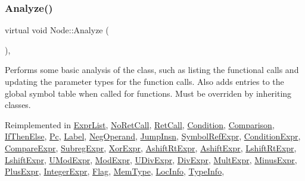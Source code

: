 \subsubsection{\texorpdfstring{Analyze()}{Analyze()}}
{\footnotesize\ttfamily virtual void Node\+::\+Analyze (\begin{DoxyParamCaption}{ }\end{DoxyParamCaption})\hspace{0.3cm}{\ttfamily [inline]}, {\ttfamily [virtual]}}

Performs some basic analysis of the class, such as listing the functional calls and updating the parameter types for the function calls. Also adds entries to the global symbol table when called for functions. Must be overriden by inheriting classes. 

Reimplemented in \hyperlink{class_expr_list_ade8c035ff7457f304c32066712d55e2e}{Expr\+List}, \hyperlink{class_no_ret_call_a9714a8c4429eb932be749909b47394fa}{No\+Ret\+Call}, \hyperlink{class_ret_call_ae97ba198b2aff2badbee17b2f02d989a}{Ret\+Call}, \hyperlink{class_condition_a899d0ab9bddcbe9f23bf0c8af84d7d10}{Condition}, \hyperlink{class_comparison_a4f77494c5f58ec539b190352455a71fb}{Comparison}, \hyperlink{class_if_then_else_a4c6beae98e9fe6d40836fdca839d76a7}{If\+Then\+Else}, \hyperlink{class_pc_a8376e5338c6f9c37363f1012722efef9}{Pc}, \hyperlink{class_label_ae77a5d8983fc941f8289a8ba4e4b56c1}{Label}, \hyperlink{class_neg_operand_a4b7facfe7b6947f5ae0118866b5c013e}{Neg\+Operand}, \hyperlink{class_jump_insn_a2173add8387a3b8bb0e5813942e42b38}{Jump\+Insn}, \hyperlink{class_symbol_ref_expr_aa410e63dd4602d66bda4e880afdb82e9}{Symbol\+Ref\+Expr}, \hyperlink{class_condition_expr_a6bad5562b63bd649a1ed921e43de0dca}{Condition\+Expr}, \hyperlink{class_compare_expr_a6433597757238a3332c637c1ad67ea87}{Compare\+Expr}, \hyperlink{class_subreg_expr_acc9be43aae902cf0727ba6b7ab8d85b1}{Subreg\+Expr}, \hyperlink{class_xor_expr_a94f8a8dfc88b60756ed6487299a1d74d}{Xor\+Expr}, \hyperlink{class_ashift_rt_expr_a324ffb5777b5ccea0e63eba79e0c67c8}{Ashift\+Rt\+Expr}, \hyperlink{class_ashift_expr_a526909d8abcf6a4286835103a0029373}{Ashift\+Expr}, \hyperlink{class_lshift_rt_expr_ae9b2290c259d8d21997f1498d79b4f40}{Lshift\+Rt\+Expr}, \hyperlink{class_lshift_expr_a7d479d7c72009f168afdb15b08e73163}{Lshift\+Expr}, \hyperlink{class_u_mod_expr_a0c1da57d7e2aff1e0e6f46f14f784a83}{U\+Mod\+Expr}, \hyperlink{class_mod_expr_aedcba31811fa2e4311c77a1989ca1d5c}{Mod\+Expr}, \hyperlink{class_u_div_expr_a5c7df8e6be9e8f173b9920d5c13e704f}{U\+Div\+Expr}, \hyperlink{class_div_expr_ac2e3fa38bfbe56b3f832266e1679200f}{Div\+Expr}, \hyperlink{class_mult_expr_accc5d3ee9e4a837eb82c8a51440f69ac}{Mult\+Expr}, \hyperlink{class_minus_expr_af9eea4a87688777fd1ad108c24dbcd11}{Minus\+Expr}, \hyperlink{class_plus_expr_aaf2180ee0d3019f23212104587c0cbb9}{Plus\+Expr}, \hyperlink{class_integer_expr_a523ca156f0653534b5c142fd496de7a4}{Integer\+Expr}, \hyperlink{class_flag_ae09e99101902e5486e9d5712749623b3}{Flag}, \hyperlink{class_mem_type_a40773866273e8e3321c67d1bfaab14da}{Mem\+Type}, \hyperlink{class_loc_info_a129d70c92d57a7ab130b699ee8052ef4}{Loc\+Info}, \hyperlink{class_type_info_a157de3b92f5333b031650065591ac04f}{Type\+Info}, 